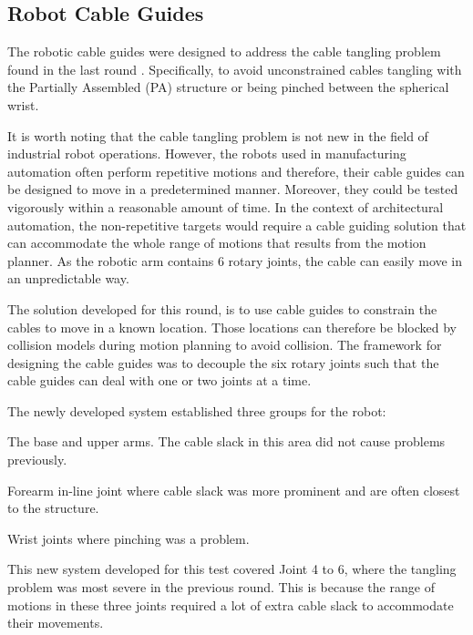 \subsection{Robot Cable Guides}
\label{subsection:exploration-3-robot-cable-guides}

The robotic cable guides were designed to address the cable tangling problem found in the last round . Specifically, to avoid unconstrained cables tangling with the Partially Assembled (PA) structure or being pinched between the spherical wrist. 

It is worth noting that the cable tangling problem is not new in the field of industrial robot operations. However, the robots used in manufacturing automation often perform repetitive motions and therefore, their cable guides can be designed to move in a predetermined manner. Moreover, they could be tested vigorously within a reasonable amount of time. In the context of architectural automation, the non-repetitive targets would require a cable guiding solution that can accommodate the whole range of motions that results from the motion planner. As the robotic arm contains 6 rotary joints, the cable can easily move in an unpredictable way.

The solution developed for this round, is to use cable guides to constrain the cables to move in a known location. Those locations can therefore be blocked by collision models during motion planning to avoid collision. The framework for designing the cable guides was to decouple the six rotary joints such that the cable guides can deal with one or two joints at a time. 

The newly developed system established three groups for the robot:

\begin{description}[style=unboxed] %
	\item [Joint 1 to 3] The base and upper arms. The cable slack in this area did not cause problems previously.
	\item [Joint 4] Forearm in-line joint where cable slack was more prominent and are often closest to the structure.
	\item [Joint 5 and 6] Wrist joints where pinching was a problem.
\end{description}

This new system developed for this test covered Joint 4 to 6, where the tangling problem was most severe in the previous round. This is because the range of motions in these three joints required a lot of extra cable slack to accommodate their movements. 

